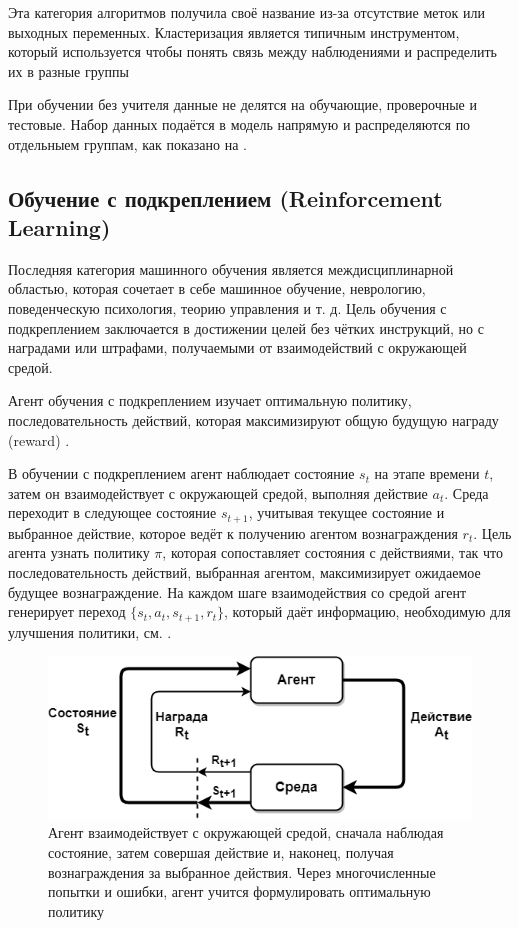 Эта категория алгоритмов получила своё название из-за отсутствие меток или выходных переменных. Кластеризация является типичным инструментом, который используется чтобы понять связь между наблюдениями и распределить их в разные группы \cite{hastie2001elements}

При обучении без учителя данные не делятся на обучающие, проверочные и тестовые. Набор данных подаётся в модель напрямую и распределяются по отдельныем группам, как показано на .


\subsection{Обучение с подкреплением (Reinforcement Learning)}

Последняя категория машинного обучения является междисциплинарной областью, которая сочетает в себе машинное обучение, неврологию, поведенческую психология, теорию управления и т. д. Цель обучения с подкреплением заключается в достижении целей без чётких инструкций, но с наградами или штрафами, получаемыми от взаимодействий с окружающей средой.

Агент обучения с подкреплением изучает оптимальную политику, последовательность действий, которая максимизируют общую будущую награду (reward) \cite{SuttonAndBarto-RL-Introduction-p2}.

В обучении с подкреплением агент наблюдает состояние ${s_t}$ на этапе времени ${t}$, затем он взаимодействует с окружающей средой, выполняя действие ${a_t}$. Среда переходит в следующее состояние ${s_{t+1}}$, учитывая текущее состояние и выбранное действие, которое ведёт к получению агентом вознаграждения ${r_t}$. Цель агента узнать политику $\pi$, которая сопоставляет состояния с действиями, так что последовательность действий, выбранная агентом, максимизирует ожидаемое будущее вознаграждение. На каждом шаге взаимодействия со средой агент генерирует переход ${\{s_t, a_t, s_{t+1}, r_t\}}$, который даёт информацию, необходимую для улучшения политики, см. .

\begin{figure}[ht!] 
	\center
	\includegraphics [scale=0.60] {my_folder/images/ch1/rl-flow.png}
	\caption{Агент взаимодействует с окружающей средой, сначала наблюдая состояние, затем совершая действие и, наконец, получая вознаграждения за выбранное действия. Через многочисленные попытки и ошибки, агент учится формулировать оптимальную политику \cite{SuttonAndBarto-RL-Introduction-p50}} 
	\label{fig:ch1-RL-flow}
\end{figure}

